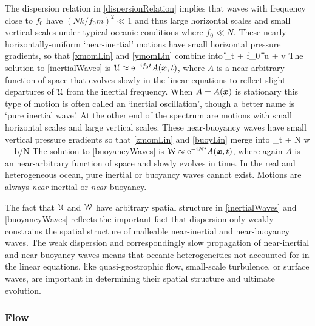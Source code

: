 \documentclass[12pt, oneside]{book}
\begin{document}
The dispersion relation in \eqref{dispersionRelation} implies that waves with frequency close to $f_0$ have $(N k / f_0 m)^2 \ll 1$ and thus large horizontal scales and small vertical scales under typical oceanic conditions where $f_0 \ll N$.  These nearly-horizontally-uniform `near-inertial' motions have small horizontal pressure gradients, so that \eqref{xmomLin} and \eqref{ymomLin} combine into 
\beq
\U_t + \ii f_0 \U {} \com \qquad {} \qquad \U {} u + \ii v \per
\label{inertialWaves}
\eeq
The solution to \eqref{inertialWaves} is $\mathcal{U} \approx \mathrm{e}^{-\mathrm{i} f_0 t} A(\boldsymbol x,t)$, where $A$ is a near-arbitrary function of space that evolves slowly in the linear equations to reflect slight departures of $\mathcal{U}$ from the inertial frequency.  When $A=A(\boldsymbol x)$ is stationary this type of motion is often called an `inertial oscillation', though a better name is `pure inertial wave'.  At the other end of the spectrum are motions with small horizontal scales and large vertical scales.  These near-buoyancy waves have small vertical pressure gradients so that \eqref{zmomLin} and \eqref{buoyLin} merge into
\beq
\W_t + \ii N \W {} \com \qquad {} \qquad \W {} w + \ii b/N \per
\label{buoyancyWaves}
\eeq
The solution to \eqref{buoyancyWaves} is $\mathcal{W} \approx \mathrm{e}^{-\mathrm{i} N t} A(\boldsymbol x,t)$, where again $A$ is an near-arbitrary function of space and slowly evolves in time.  In the real and  heterogeneous ocean, pure inertial or buoyancy waves cannot exist.  Motions are always \textit{near}-inertial or \textit{near}-buoyancy.  

The fact that $\mathcal{U}$ and $\mathcal{W}$ have arbitrary spatial structure in \eqref{inertialWaves} and \eqref{buoyancyWaves} reflects the important fact that dispersion only weakly constrains the spatial structure of malleable near-inertial and near-buoyancy waves.  The weak dispersion and correspondingly slow propagation of near-inertial and near-buoyancy waves means that oceanic heterogeneities not accounted for in the linear equations, like quasi-geostrophic flow, small-scale turbulence, or surface waves, are important in determining their spatial structure and ultimate evolution.

\subsubsection{Flow} 
\end{document}
